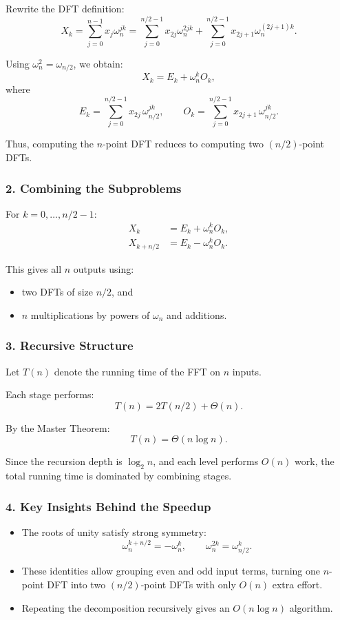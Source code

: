 \documentclass[9pt]{extarticle}
\begin{document}
Rewrite the DFT definition:
\[
X_k
= \sum_{j=0}^{n-1} x_j \omega_n^{jk}
= \sum_{j=0}^{n/2-1} x_{2j} \omega_n^{2jk}
  + \sum_{j=0}^{n/2-1} x_{2j+1} \omega_n^{(2j+1)k}.
\]

Using $\omega_n^{2} = \omega_{n/2}$, we obtain:
\[
X_k
= 
E_k + \omega_n^{k} O_k,
\]
where
\[
E_k = \sum_{j=0}^{n/2-1} x_{2j}\,\omega_{n/2}^{jk},
\qquad
O_k = \sum_{j=0}^{n/2-1} x_{2j+1}\,\omega_{n/2}^{jk}.
\]

Thus, computing the $n$-point DFT reduces to computing two $(n/2)$-point DFTs.

\subsubsection*{2. Combining the Subproblems}

For $k = 0,\dots,n/2 - 1$:
\[
\begin{aligned}
X_k &= E_k + \omega_n^k O_k,\\
X_{k + n/2} &= E_k - \omega_n^k O_k.
\end{aligned}
\]

This gives all $n$ outputs using:
\begin{itemize}
    \item two DFTs of size $n/2$, and
    \item $n$ multiplications by powers of $\omega_n$ and additions.
\end{itemize}

\subsubsection*{3. Recursive Structure}

Let $T(n)$ denote the running time of the FFT on $n$ inputs.

Each stage performs:
\[
T(n) = 2T(n/2) + \Theta(n).
\]

By the Master Theorem:
\[
T(n) = \Theta(n \log n).
\]

Since the recursion depth is $\log_2 n$, and each level performs $O(n)$ work,
the total running time is dominated by combining stages.

\subsubsection*{4. Key Insights Behind the Speedup}

\begin{itemize}
    \item The roots of unity satisfy strong symmetry:
          \[
          \omega_n^{k+n/2} = -\omega_n^{k},
          \qquad
          \omega_n^{2k} = \omega_{n/2}^{k}.
          \]
    \item These identities allow grouping even and odd input terms, turning one
          $n$-point DFT into two $(n/2)$-point DFTs with only $O(n)$ extra effort.
    \item Repeating the decomposition recursively gives an $O(n \log n)$ algorithm.
\end{itemize}
\end{document}
